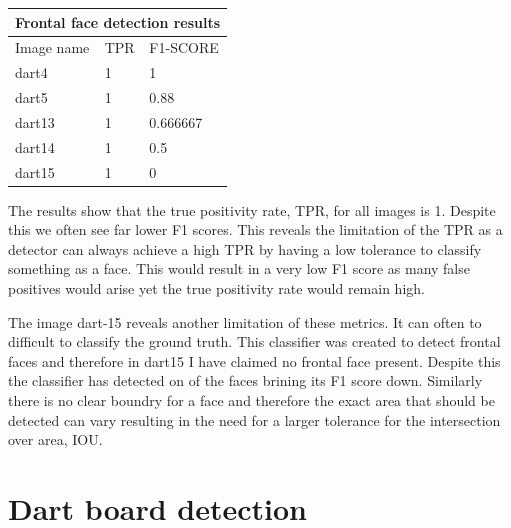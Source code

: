 \documentclass{article}
\begin{document}
\begin{multicols}{2}
\begin{tabular}{ |p{2cm}||p{2cm}|p{2cm}| }
 \hline
 \multicolumn{3}{|c|}{Frontal face detection results} \\
 \hline
 Image name & TPR & F1-SCORE \\
 \hline
 dart4  & 1   & 1         \\
 dart5  & 1   & 0.88      \\
 dart13 & 1   & 0.666667  \\ 
 dart14 & 1   & 0.5       \\ 
 dart15 & 1   & 0         \\ 
 \hline
\end{tabular}

\bigskip

The results show that the true positivity rate, TPR, for all images is 1.
Despite this we often see far lower F1 scores. This reveals the limitation of
the TPR as a detector can always achieve a high TPR by having a low tolerance
to classify something as a face. This would result in a very low F1 score as
many false positives would arise yet the true positivity rate would remain
high.

The image dart-15 reveals another limitation of these metrics. It can often to
difficult to classify the ground truth. This classifier was created to detect
frontal faces and therefore in dart15 I have claimed no frontal face present.
Despite this the classifier has detected on of the faces brining its F1 score
down. Similarly there is no clear boundry for a face and therefore the exact
area that should be detected can vary resulting in the need for a larger
tolerance for the intersection over area, IOU.

\section{Dart board detection}

\end{multicols}
\end{document}
